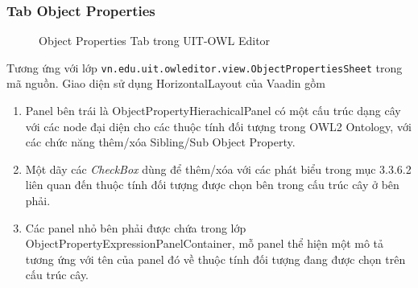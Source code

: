 \subsubsection{Tab Object Properties}  
\begin{figure}[h!]
	\centering
	\caption{Object Properties Tab trong UIT-OWL Editor\label{overflow}}
\end{figure}
Tương ứng với lớp \verb|vn.edu.uit.owleditor.view.ObjectPropertiesSheet| trong mã nguồn. Giao diện sử dụng HorizontalLayout của Vaadin gồm 
\begin{enumerate}
\item Panel bên trái là ObjectPropertyHierachicalPanel có một cấu trúc dạng cây với các node đại diện cho các thuộc tính đối tượng trong OWL2 Ontology, với các chức năng thêm/xóa Sibling/Sub Object Property.
\item Một dãy các \textit{CheckBox} dùng để thêm/xóa với các phát biểu trong mục 3.3.6.2 liên quan đến thuộc tính đối tượng được chọn bên trong cấu trúc cây ở bên phải.
\item Các panel nhỏ bên phải được chứa trong lớp ObjectPropertyExpressionPanelContainer, mỗ panel thể hiện một mô tả tương ứng với tên của panel đó về thuộc tính đối tượng đang được chọn trên cấu trúc cây.
\end{enumerate}	

